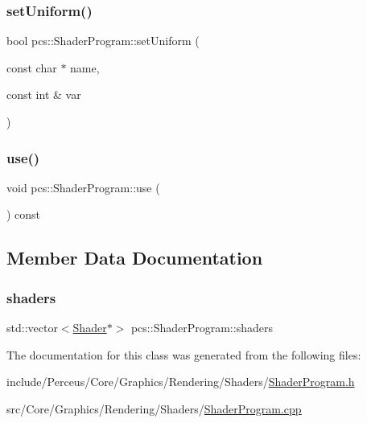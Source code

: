 \subsubsection{\texorpdfstring{set\+Uniform()}{setUniform()}\hspace{0.1cm}{\footnotesize\ttfamily [3/3]}}
{\footnotesize\ttfamily bool pcs\+::\+Shader\+Program\+::set\+Uniform (\begin{DoxyParamCaption}\item[{const char $\ast$}]{name,  }\item[{const int \&}]{var }\end{DoxyParamCaption})}

\mbox{\label{classpcs_1_1ShaderProgram_a48d59dd2b34d48355ba56dd6a85eb7cf}} 
\subsubsection{\texorpdfstring{use()}{use()}}
{\footnotesize\ttfamily void pcs\+::\+Shader\+Program\+::use (\begin{DoxyParamCaption}{ }\end{DoxyParamCaption}) const\hspace{0.3cm}{\ttfamily [inline]}}



\subsection{Member Data Documentation}
\mbox{\label{classpcs_1_1ShaderProgram_a3e0f3697d57eeaf50e3d1d6bc9b18021}} 
\subsubsection{\texorpdfstring{shaders}{shaders}}
{\footnotesize\ttfamily std\+::vector$<$\hyperlink{classpcs_1_1Shader}{Shader}$\ast$$>$ pcs\+::\+Shader\+Program\+::shaders\hspace{0.3cm}{\ttfamily [private]}}



The documentation for this class was generated from the following files\+:\begin{DoxyCompactItemize}
\item 
include/\+Perceus/\+Core/\+Graphics/\+Rendering/\+Shaders/\hyperlink{ShaderProgram_8h}{Shader\+Program.\+h}\item 
src/\+Core/\+Graphics/\+Rendering/\+Shaders/\hyperlink{ShaderProgram_8cpp}{Shader\+Program.\+cpp}\end{DoxyCompactItemize}
